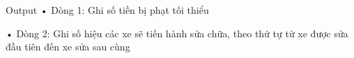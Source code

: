 Output
• Dòng 1: Ghi số tiền bị phạt tối thiểu


• Dòng 2: Ghi số hiệu các xe sẽ tiến hành sửa chữa, theo thứ tự từ xe được sửa đầu tiên đến xe sửa sau cùng